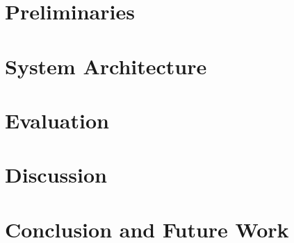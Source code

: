 \documentclass[a4paper,10pt,twoside]{report}
\begin{document}
\clearemptydoublepage

\chapter{Preliminaries}\label{chapter:preliminaries}


\clearemptydoublepage

\chapter{System Architecture}\label{chapter:systemArchitecture}


\clearemptydoublepage

\chapter{Evaluation}\label{chapter:evaluation}


\clearemptydoublepage

\chapter{Discussion}\label{chapter:discussion}


\clearemptydoublepage

\chapter{Conclusion and Future Work}\label{chapter:conclusions}


\clearemptydoublepage

%



\clearemptydoublepage

\appendix
{}


\end{document}
